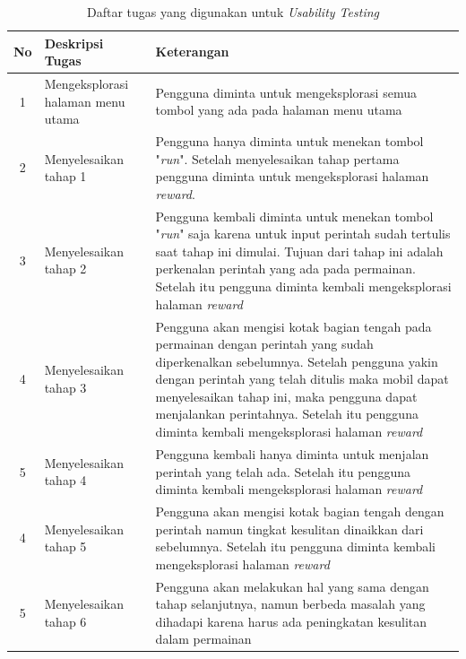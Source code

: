 	\begin{longtable}{| c | p{4.5cm} | p{7cm} |}
		\caption{Daftar tugas yang digunakan untuk \textit{Usability Testing}} \\
		\hline
		No & Deskripsi Tugas & Keterangan\\ 
		\hline
		\endhead
		1 & Mengeksplorasi halaman menu utama & Pengguna diminta untuk mengeksplorasi semua tombol yang ada pada halaman menu utama\\ 
		\hline
		2 & Menyelesaikan tahap 1 & Pengguna hanya diminta untuk menekan tombol "\textit{run}". Setelah menyelesaikan tahap pertama pengguna diminta untuk mengeksplorasi halaman \textit{reward}. \\ \hline
		3 & Menyelesaikan tahap 2 & Pengguna kembali diminta untuk menekan tombol "\textit{run}" saja karena untuk input perintah sudah tertulis saat tahap ini dimulai. Tujuan dari tahap ini adalah perkenalan perintah yang ada pada permainan. Setelah itu pengguna diminta kembali mengeksplorasi halaman  \textit{reward} \\ \hline
		4 & Menyelesaikan tahap 3 & Pengguna akan mengisi kotak bagian tengah pada permainan dengan perintah yang sudah diperkenalkan sebelumnya. Setelah pengguna yakin dengan perintah yang telah ditulis maka mobil dapat menyelesaikan tahap ini, maka pengguna dapat menjalankan perintahnya. Setelah itu pengguna diminta kembali mengeksplorasi halaman  \textit{reward}\\ \hline
		5 & Menyelesaikan tahap 4 & Pengguna kembali hanya diminta untuk menjalan perintah yang telah ada. Setelah itu pengguna diminta kembali mengeksplorasi halaman  \textit{reward}\\ \hline
		4 & Menyelesaikan tahap 5 & Pengguna akan mengisi kotak bagian tengah dengan perintah namun tingkat kesulitan dinaikkan dari sebelumnya. Setelah itu pengguna diminta kembali mengeksplorasi halaman  \textit{reward}\\ \hline
		5 & Menyelesaikan tahap 6 & Pengguna akan melakukan hal yang sama dengan tahap selanjutnya, namun berbeda masalah yang dihadapi karena harus ada peningkatan kesulitan dalam permainan \\ \hline
	\end{longtable}
